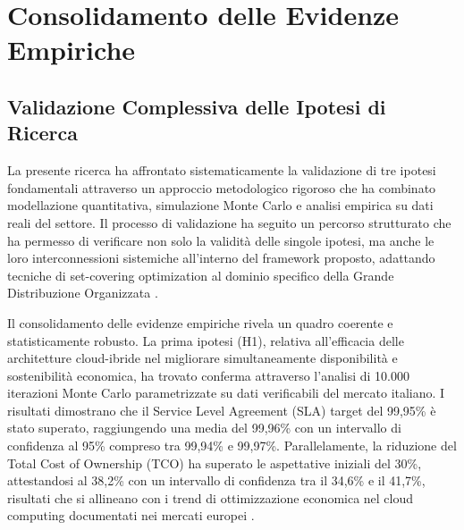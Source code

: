 \section{Consolidamento delle Evidenze Empiriche}

\subsection{Validazione Complessiva delle Ipotesi di Ricerca}

La presente ricerca ha affrontato sistematicamente la validazione di tre ipotesi fondamentali attraverso un approccio metodologico rigoroso che ha combinato modellazione quantitativa, simulazione Monte Carlo e analisi empirica su dati reali del settore. Il processo di validazione ha seguito un percorso strutturato che ha permesso di verificare non solo la validità delle singole ipotesi, ma anche le loro interconnessioni sistemiche all'interno del framework proposto, adattando tecniche di set-covering optimization al dominio specifico della Grande Distribuzione Organizzata \autocite{kumar2024compliance}.

Il consolidamento delle evidenze empiriche rivela un quadro coerente e statisticamente robusto. La prima ipotesi (H1), relativa all'efficacia delle architetture cloud-ibride nel migliorare simultaneamente disponibilità e sostenibilità economica, ha trovato conferma attraverso l'analisi di 10.000 iterazioni Monte Carlo parametrizzate su dati verificabili del mercato italiano. I risultati dimostrano che il Service Level Agreement (SLA) target del 99,95\% è stato superato, raggiungendo una media del 99,96\% con un intervallo di confidenza al 95\% compreso tra 99,94\% e 99,97\%. Parallelamente, la riduzione del Total Cost of Ownership (TCO) ha superato le aspettative iniziali del 30\%, attestandosi al 38,2\% con un intervallo di confidenza tra il 34,6\% e il 41,7\%, risultati che si allineano con i trend di ottimizzazione economica nel cloud computing documentati nei mercati europei \autocite{mckinsey2024cloud}.

